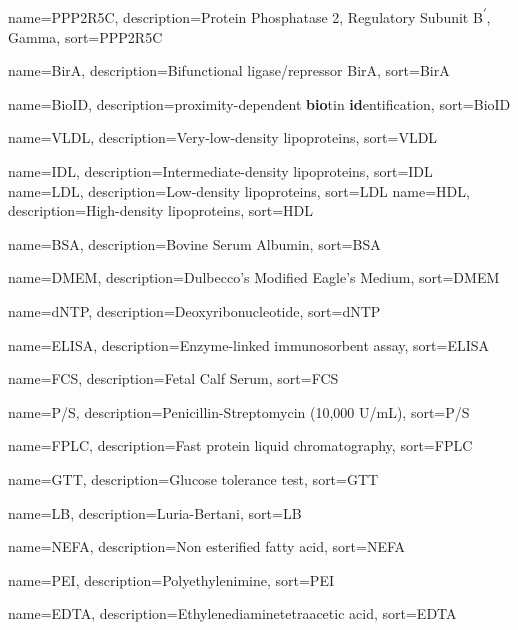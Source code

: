 {
  name=PPP2R5C,
  description={Protein Phosphatase 2, Regulatory Subunit B\textsuperscript{\ensuremath{\prime}}, Gamma},
  sort=PPP2R5C
}

{
  name=BirA,
  description={Bifunctional ligase/repressor BirA},
  sort=BirA
}

{
  name=BioID,
  description={proximity-dependent \textbf{bio}tin \textbf{id}entification},
  sort=BioID
}


{
  name=VLDL,
  description={Very-low-density lipoproteins},
  sort=VLDL
}


{
  name=IDL,
  description={Intermediate-density lipoproteins},
  sort=IDL
}
{
  name=LDL,
  description={Low-density lipoproteins},
  sort=LDL
}
{
  name=HDL,
  description={High-density lipoproteins},
  sort=HDL
}

{
  name=BSA,
  description={Bovine Serum Albumin},
  sort=BSA
}

{
  name=DMEM,
  description={Dulbecco's Modified Eagle's Medium},
  sort=DMEM
}


{
  name=dNTP,
  description={Deoxyribonucleotide},
  sort=dNTP
}

{
  name=ELISA,
  description={Enzyme-linked immunosorbent assay},
  sort=ELISA
}

{
  name=FCS,
  description={Fetal Calf Serum},
  sort=FCS
}

{
  name=P/S,
  description={Penicillin-Streptomycin (10,000 U/mL)},
  sort=P/S
}

{
  name=FPLC,
  description={Fast protein liquid chromatography},
  sort=FPLC
}

{
  name=GTT,
  description={Glucose tolerance test},
  sort=GTT
}

{
  name=LB,
  description={Luria-Bertani},
  sort=LB
}

{
  name=NEFA,
  description={Non esterified fatty acid},
  sort=NEFA
}

{
  name=PEI,
  description={Polyethylenimine},
  sort=PEI
}

{
  name=EDTA,
  description={Ethylenediaminetetraacetic acid},
  sort=EDTA
}

